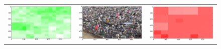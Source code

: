 \begin{figure}
\begin{tabular}{ccc}
\includegraphics[keepaspectratio=true,width=\segwidth]{images/segment/253_01__animals__.png} &
\includegraphics[keepaspectratio=true,width=\segwidth]{images/segment/253_01__image__.png} &
\includegraphics[keepaspectratio=true,width=\segwidth]{images/segment/253_01__plastic__.png} \\


\end{tabular}
\end{figure}

